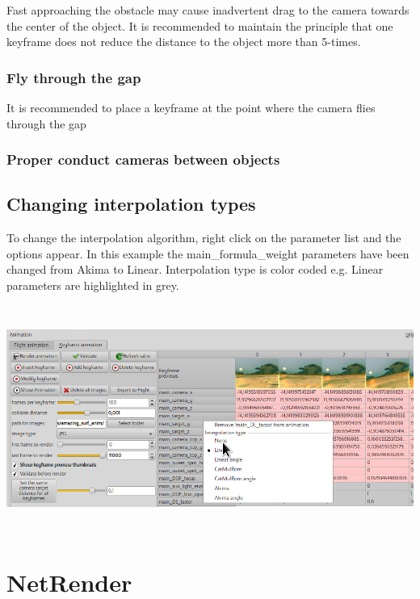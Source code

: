 Fast approaching the obstacle may cause inadvertent drag to the camera
towards the center of the object. It is recommended to maintain the
principle that one keyframe does not reduce the distance to the object
more than 5-times.

\subsubsection{Fly through the gap}\label{fly-through-the-gap}

It is recommended to place a keyframe at the point where the camera
flies through the gap

\subsubsection{Proper conduct cameras between
objects}\label{proper-conduct-cameras-between-objects}

\hypertarget{changing-interpolation-types}{\subsection{Changing
interpolation types}\label{changing-interpolation-types}}

To change the interpolation algorithm, right click on the parameter list
and the options appear. In this example the main\_formula\_weight
parameters have been changed from Akima to Linear. Interpolation type is
color coded e.g. Linear parameters are highlighted in grey.

\includegraphics[width=6.69291in,height=2.92087in]{img/manual/media/image28.png}

\hypertarget{netrender}{\section{NetRender}\label{netrender}}

